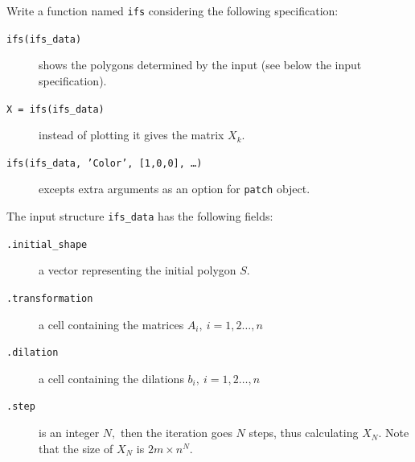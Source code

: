 \documentclass[a4paper, fleqn, 10pt]{report}
\theoremstyle{definition}
\newcommand{\mc}[1]{{\color{Blue}\tt #1}}
\newcommand{\mck}[1]{{\tt#1}}
\begin{document}
Write a function named \mc{ifs} considering the following specification:
\begin{description}
 \item[\mc{ifs}\mck{(ifs\_data)}] shows the polygons determined by the input (see below the input specification).
 \item[\mck{X = }\mc{ifs}\mck{(ifs\_data)}] instead of plotting it gives the matrix $X_k.$
 \item[\mc{ifs}\mck{(ifs\_data, 'Color', [1,0,0], \dots)}] excepts extra arguments as an option for \mc{patch} object.
\end{description}

The input structure \mck{ifs\_data} has the following fields:
\begin{description}
 \item[\mck{.initial\_shape}] a vector representing the initial polygon $S.$
 \item[\mck{.transformation}] a cell containing the matrices $A_i,\ i=1,2\dots,n$
 \item[\mck{.dilation}] a cell containing the dilations $b_i,\ i=1,2\dots,n$
 \item[\mck{.step}] is an integer $N,$ then the iteration goes $N$ steps, thus calculating $X_N.$
		    Note that the size of $X_N$ is $2m\times n^N.$
\end{description}
\end{document}
